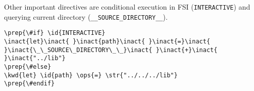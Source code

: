 \documentclass[10pt,landscape]{article}
\newcommand{\id}[1]{\textcolor[HTML]{000000}{#1}}
\newcommand{\str}[1]{\textcolor[HTML]{A31515}{#1}}
\newcommand{\kwd}[1]{\textcolor[HTML]{0000FF}{#1}}
\newcommand{\ops}[1]{\textcolor[HTML]{000000}{#1}}
\newcommand{\inact}[1]{\textcolor[HTML]{808080}{#1}}
\newcommand{\prep}[1]{\textcolor[HTML]{0000FF}{#1}}
\begin{document}
\begin{multicols}{3}
\begin{Verbatim}[commandchars=\\\{\}]
\end{Verbatim}



Other important directives are conditional execution in FSI (\texttt{INTERACTIVE}) and querying current directory (\texttt{\_\_SOURCE\_DIRECTORY\_\_}).
\begin{Verbatim}[commandchars=\\\{\}]
\prep{\#if} \id{INTERACTIVE}
\inact{let}\inact{ }\inact{path}\inact{ }\inact{=}\inact{ }\inact{\_\_SOURCE\_DIRECTORY\_\_}\inact{ }\inact{+}\inact{ }\inact{"../lib"}
\prep{\#else}
\kwd{let} \id{path} \ops{=} \str{"../../../lib"}
\prep{\#endif}
\end{Verbatim}





\end{multicols}
\end{document}
